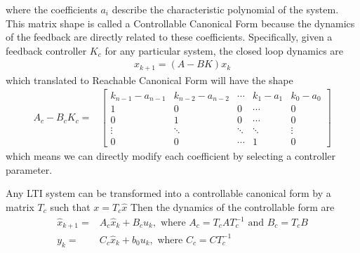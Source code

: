 \documentclass[sigconf]{llncs}
\newcommand{\mat}[1]{{#1}}
\renewcommand{\vec}[1]{{#1}}
\begin{document}
where the coefficients $a_i$ describe the characteristic polynomial of the system. This matrix shape is
called a Controllable Canonical Form because the dynamics of the feedback are directly related to these
coefficients. Specifically, given a feedback controller $\mat{K}_c$ for any particular system, the closed loop dynamics
are
\begin{align}
\vec{x}_{k+1}=(\mat{A}-\mat{B}\mat{K})\vec{x}_k
\label{eq:closeloopdynamics}
\end{align}
which translated to Reachable Canonical Form will have the shape
\begin{align}
\mat{A}_c-\mat{B}_c\mat{K}_c=&\left[
\begin{array}{ccccc}
k_{n-1}-a_{n-1}&k_{n-2}-a_{n-2}&\cdots&k_1-a_1&k_0-a_0\\
1&0&0&\cdots&0\\
0&1&0&\cdots&0\\
\vdots&\ddots&\ddots&\ddots&\vdots\\
0&0&\cdots&1&0
\end{array}\right]
\label{eq:cf_SISO_fb}
\end{align}
which means we can directly modify each coefficient by selecting a controller parameter.

Any LTI system can be transformed into a controllable canonical form by a matrix $\mat{T}_c$ such that $\vec{x}=\mat{T}_c\hat{\vec{x}}$
Then the dynamics of the controllable form are
\begin{align*}
\hat{\vec{x}}_{k+1}=&\mat{A}_c\hat{\vec{x}}_k+\mat{B}_cu_k, \text{ where } \mat{A}_c=\mat{T}_c\mat{A}\mat{T}_c^{-1} \text{ and } \mat{B}_c=\mat{T}_c\mat{B}\\
y_k=&\mat{C}_c\hat{\vec{x}}_k + b_0u_k, \text{ where } \mat{C}_c=\mat{C}\mat{T}_c^{-1}\nonumber
\end{align*}
%
\end{document}
